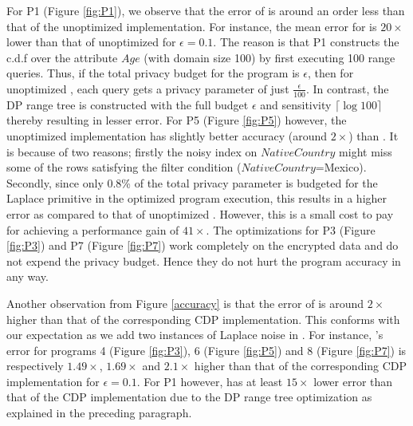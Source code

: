 For P1 (Figure \ref{fig:P1}), we observe that the error of \system is around an order less than that of the unoptimized implementation. For instance, the mean error for \system is $20\times$ lower than that of unoptimized \system for $\epsilon=0.1$.  The reason is that P1 constructs the c.d.f over the attribute $Age$ (with domain size 100) by first executing 100 range queries. %
Thus, if the total privacy budget for the program is $\epsilon$, then for unoptimized \system, each query gets a privacy parameter of just $\frac{\epsilon}{100}$. In contrast, the DP range tree is constructed with the full budget $\epsilon$ and sensitivity $\lceil\log 100\rceil$ thereby resulting in lesser error. For P5 (Figure \ref{fig:P5}) however, the unoptimized implementation has slightly better accuracy (around $2\times$) than \system. It is because of two reasons; firstly the noisy index on $NativeCountry$ might miss some of the rows satisfying the filter condition ($NativeCountry$=Mexico). Secondly, since only 0.8\% of the total privacy parameter is budgeted for the \textsf{Laplace} primitive in the optimized program execution, this results in a higher error as compared to that of unoptimized \system. However, this is a small  cost to pay for achieving a performance gain of $41\times$. The optimizations for P3 (Figure \ref{fig:P3}) and P7 (Figure \ref{fig:P7}) work completely on the encrypted data and do not expend the privacy budget. Hence they do not hurt the program accuracy in any way.
 
 Another observation from Figure \ref{accuracy} is that the error of \system is around $2\times$ higher than that of the corresponding \textsf{CDP} implementation. This conforms with our expectation as we add two instances of Laplace noise in \system. For instance, \system's error for programs 4 (Figure \ref{fig:P3}), 6 (Figure \ref{fig:P5}) and 8 (Figure \ref{fig:P7})  is respectively $1.49\times$, $1.69 \times$ and $2.1\times$ higher  than that of the corresponding \textsf{CDP} implementation for $\epsilon=0.1$.  For P1 however, \system has at least $15\times$ lower error than that of the \textsf{CDP} implementation due to the DP range tree optimization as explained in the preceding paragraph.
 

